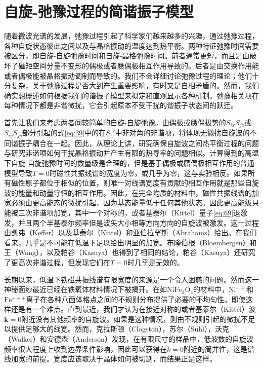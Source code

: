 \documentclass{article}
\begin{document}

\section{自旋-弛豫过程的简谐振子模型} \label{sec:10}

随着微波光谱的发展，弛豫过程引起了科学家们越来越多的兴趣，通过弛豫过程，各种自旋状态彼此之间以及与晶格振动的温度达到热平衡。两种特征弛豫时间需要被区分，即自旋-自旋弛豫时间和自旋-晶格弛豫时间。前者通常更短，而且是由破坏了磁矩空间分量不变形的偶极或者赝偶极相互作用导致的。后者是由交换作用能或者偶极能被晶格振动调制而导致的。我们不会详细讨论弛豫过程的理论；他们十分复杂，关于弛豫过程是否大到产生重要影响，有时又是自相矛盾的。然而，我们确实想概述如何根据我们的谐振子模型来拟定和直观显示各种机制。弛豫相关项在每种情况下都是非谐微扰，它会引起原本不受干扰的谐振子状态间的跃迁。

首先让我们来考虑两者间较简单的自旋-自旋弛豫。由偶极或赝偶极势的$S_{ix}S_{jz}$或$S_{iy}S_{jy}$部分引起的式\eqref{eq:39}中的在$S_z'$中非对角的非谐项，将体现无微扰自旋波的不同谐振子耦合在一起。因此，从理论上讲，研究确保自旋波之间热平衡过程的问题与研究非谐项如何干扰晶格振动并产生有限的热导率的问题相似。计算得到的高温下自旋-自旋弛豫时间的数量级是合理的，但是基于偶极或赝偶极相互作用的普通模型导致$T=0$时磁性共振线谱的宽度为零，或几乎为零，这与实验相反。如果所有磁性原子都位于相似的位置，则唯一对线谱宽度有贡献的相互作用就是那些自旋波的能量和动量守恒的相互作用。因此，在完全均质的材料中，磁性共振线谱的加宽必须由更高能态的微扰引起，因为基态能量低于任何其他状态。因此更高能级只能被三次非谐项加宽，其中一个对称的，或者基泰尔（Kittel）量子\eqref{eq:69}退激发，并且两个半基泰尔频率但是波矢大小相等方向方向的自旋波被激发。这一过程由凯弗（Keffer）以及基泰尔（Kittel）和亚伯拉罕斯（Abrahams）给出。在我们看来，几乎是不可能在低温下足以给出明显的加宽。布隆伯根（Bloembergen）和王（Wang），以及粕谷（Kasuya）也得到了相同的结论，粕谷（Kasuya）还研究了更高次非谐过程，但发现它们在$T=0$时几乎是无效的。

长期以来，低温下铁磁共振线谱有限宽度的来源是一个令人困惑的问题。然而这一神秘面纱最近已经在铁氧体材料情况下被揭开。在如$\mathrm{NiFe_3O_4}$的材料中，$\mathrm{Ni^{\mathit{++}}}$和$\mathrm{Fe^{\mathit{+++}}}$离子在各种八面体格点之间的不规则分布提供了必要的不均匀性。即使这样还是有一个难点。直到最近，我们才认为在接近对称的或者基泰尔（Kittel）波$\mathbf{k}=0$附近没有其他频率的自旋波。如果是这种情况，则由不规则引起的微扰不足以提供足够大的线宽。然而，克拉斯顿（Clogston），苏尔（Suhl），沃克（Walker）和安德森（Anderson）发现，在有限尺寸的样品中，低波数的自旋波频率很大程度上收到边界条件影响，因此可以获得在$k=0$附近的简并性，这是谱线加宽的前提。宽度应该取决于晶体如何被切割，而结果正是这样。
\end{document}
